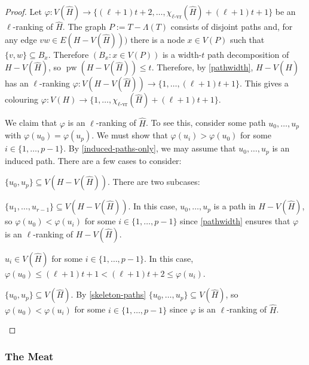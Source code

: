 \documentclass[kpfonts]{patmorin}
\DeclareMathOperator{\pw}{pw}
\newcommand{\rn}[1]{\chi_{\operatorname{#1-vr}}}
\newcommand{\lrn}{\rn{\ell}}
\theoremstyle{named}
\begin{document}
\begin{proof}
    Let $\varphi:V(\hat{H})\to \{(\ell+1)t+2,\ldots,\lrn(\hat{H})+(\ell+1)t+1\}$ be an $\ell$-ranking of $\hat{H}$. The graph $P:=T-\Lambda(T)$ consists of disjoint paths and, for any edge $vw\in E(H-V(\hat{H})))$ there is a node $x\in V(P)$ such that $\{v,w\}\subseteq B_x$.  Therefore $(B_x:x\in V(P))$ is a width-$t$ path decomposition of $H-V(\hat{H})$, so $\pw(H-V(\hat{H}))\le t$.  Therefore, by \cref{pathwidth}, $H-V(\hat{H})$ has an $\ell$-ranking $\varphi:V(H-V(\hat{H}))\to\{1,\ldots,(\ell+1)t+1\}$.  This gives a colouring $\varphi: V(H)\to\{1,\ldots,\lrn(\hat{H})+(\ell+1)t+1\}$.

    We claim that $\varphi$ is an $\ell$-ranking of $\hat{H}$.  To see this, consider some path $u_0,\ldots,u_p$ with $\varphi(u_0)=\varphi(u_p)$.  We must show that $\varphi(u_i)>\varphi(u_0)$ for some $i\in\{1,\ldots,p-1\}$.
    By \cref{induced-paths-only}, we may assume that $u_0,\ldots,u_p$ is an induced path. There are a few cases to consider:
    \begin{compactenum}
        \item $\{u_0,u_p\}\subseteq V(H-V(\hat{H}))$. There are two subcases:
        \begin{compactenum}
            \item $\{u_1,\ldots,u_{r-1}\}\subseteq V(H-V(\hat{H}))$.  In this case, $u_0,\ldots,u_p$ is a path in $H-V(\hat{H})$, so  $\varphi(u_0)<\varphi(u_i)$ for some $i\in\{1,\ldots,p-1\}$ since \cref{pathwidth} ensures that $\varphi$ is an $\ell$-ranking of $H-V(\hat{H})$.

            \item $u_i\in V(\hat{H})$ for some $i\in\{1,\ldots,p-1\}$. In this case, $\varphi(u_0)\le (\ell+1)t+1 < (\ell+1)t+2 \le \varphi(u_i)$.
        \end{compactenum}
        \item $\{u_0,u_p\}\subseteq V(\hat{H})$.
        By \cref{skeleton-paths}  $\{u_0,\ldots,u_p\}\subseteq V(\hat{H})$, so  $\varphi(u_0)<\varphi(u_i)$ for some $i\in\{1,\ldots,p-1\}$ since $\varphi$ is an $\ell$-ranking of $\hat{H}$. \qedhere
    \end{compactenum}
\end{proof}

\subsubsection{The Meat}
\end{document}
